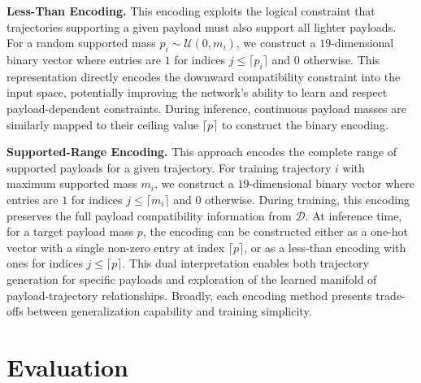 \noindent\textbf{Less-Than Encoding.} This encoding exploits the logical constraint that trajectories supporting a given payload must also support all lighter payloads.
For a random supported mass $p_i \sim \mathcal{U}(0, m_i)$, we construct a $19$-dimensional binary vector where entries are $1$ for indices $j \leq \lceil p_i \rceil$ and $0$ otherwise.
This representation directly encodes the downward compatibility constraint into the input space, potentially improving the network's ability to learn and respect payload-dependent constraints.
During inference, continuous payload masses are similarly mapped to their ceiling value $\lceil p \rceil$ to construct the binary encoding.

\noindent\textbf{Supported-Range Encoding.}
This approach encodes the complete range of supported payloads for a given trajectory.
For training trajectory $i$ with maximum supported mass $m_i$, we construct a $19$-dimensional binary vector where entries are $1$ for indices $j \leq \lceil m_i \rceil$ and $0$ otherwise.
During training, this encoding preserves the full payload compatibility information from $\mathcal{D}$.
At inference time, for a target payload mass $p$, the encoding can be constructed either as a one-hot vector with a single non-zero entry at index $\lceil p \rceil$, or as a less-than encoding with ones for indices $j \leq \lceil p \rceil$.
This dual interpretation enables both trajectory generation for specific payloads and exploration of the learned manifold of payload-trajectory relationships.
Broadly, each encoding method presents trade-offs between generalization capability and training simplicity.

\section{Evaluation}
\label{sec:payload:evaluation}


